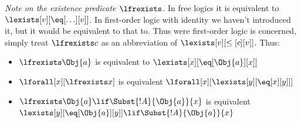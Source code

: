 \documentclass[../../../include/open-logic-section]{subfiles}
\begin{document}
\emph{Note on the existence predicate $\lfrexists$}. In free logics
it is equivalent to $\lexists[v][\eq[\ldots][v]]$. In first-order
logic with identity we haven't introduced it, but it would be
equivalent to that to. Thus were first-order logic is concerned,
simply treat $\lfrexists c$ as an abbreviation of
 $\lexists[v][\leq[c][v]]$.
Thus:
\begin{itemize}
    \item $\lfrexists \Obj{a}$ is 
    equivalent to $\lexists[x][\eq[\Obj{a}][x]]$
    \item $\lforall[x][\lfrexists x]$ is 
    equivalent $\lforall[x][\lexists[y][\eq[x][y]]]$
    \item $\lfrexists\Obj{a}\lif\Subst{!A}{\Obj{a}}{x}$ is 
    equivalent $\lexists[y][\eq[\Obj{a}][y]]\lif\Subst{!A}{\Obj{a}}{x}$
\end{itemize}
\end{document}
